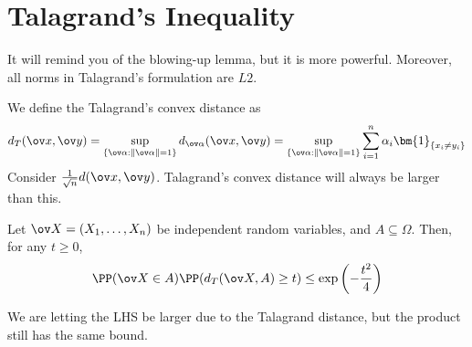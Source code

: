 \section{Talagrand's Inequality}
\begin{note}
    It will remind you of the blowing-up lemma, but it is more powerful. Moreover, all norms in Talagrand's formulation are $L2$.
\end{note}
\begin{definition}
We define the Talagrand's convex distance as 
\begin{equation}
    d_T(\ov x, \ov y) = \sup_{\{\ov\alpha: \|\ov\alpha\| = 1\}} d_{\ov \alpha} (\ov x, \ov y) = \sup_{\{\ov\alpha: \|\ov\alpha\| = 1\} }\sum_{i=1}^n \alpha_i \bm{1}_{\{x_i \neq y_i\}}
\end{equation}
Consider $\frac{1}{\sqrt n} d(\ov x, \ov y)$. Talagrand's convex distance will always be larger than this.
\end{definition}
\begin{theorem}\label{thm:talagrand-inequality}
Let $\ov X = (X_1, \dots, X_n)$ be independent random variables, and $A \subseteq \Omega$. Then, for any $t \geq 0$,
\[
\PP(\ov X \in A) \PP(d_T(\ov X, A) \geq t) \leq \exp\left(-\frac{t^2}{4}\right)
\]
\end{theorem}
\begin{remark}
We are letting the LHS be larger due to the Talagrand distance, but the product still has the same bound.
\end{remark}
